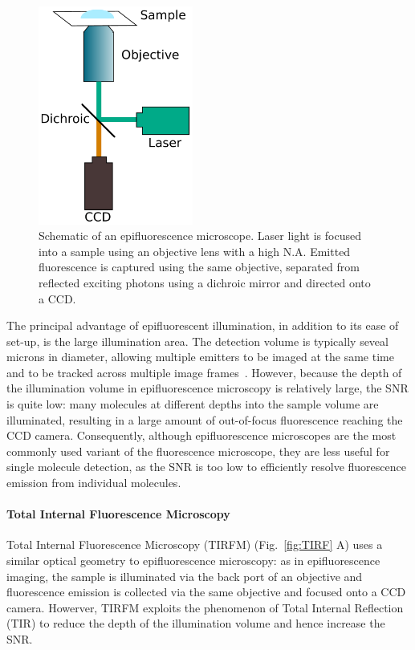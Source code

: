 \begin{figure}
	\begin{center}
	\includegraphics*[clip=true, width=2in]{introduction/epi.pdf}
	\caption{Schematic of an epifluorescence microscope. Laser light is focused into a sample using an objective lens with a high N.A. Emitted fluorescence is captured using the same objective, separated from reflected exciting photons using a dichroic mirror and directed onto a CCD.}
	\label{fig:epi}
	\end{center}
\end{figure}

The principal advantage of epifluorescent illumination, in addition to its ease of set-up, is the large illumination area. The detection volume is typically seveal microns in diameter, allowing multiple emitters to be imaged at the same time and to be tracked across multiple image frames~\cite{Webb2014}. However, because the depth of the illumination volume in epifluorescence microscopy is relatively large, the SNR is quite low: many molecules at different depths into the sample volume are illuminated, resulting in a large amount of out-of-focus fluorescence reaching the CCD camera. Consequently, although epifluorescence microscopes are the most commonly used variant of the fluorescence microscope, they are less useful for single molecule detection, as the SNR is too low to efficiently resolve fluorescence emission from individual molecules.

\paragraph{Total Internal Fluorescence Microscopy}
Total Internal Fluorescence Microscopy (TIRFM) (Fig.~\ref{fig:TIRF} A) uses a similar optical geometry to epifluorescence microscopy: as in epifluorescence imaging, the sample is illuminated via the back port of an objective and fluorescence emission is collected via the same objective and focused onto a CCD camera. Howerver, TIRFM exploits the phenomenon of Total Internal Reflection (TIR) to reduce the depth of the illumination volume and hence increase the SNR.

